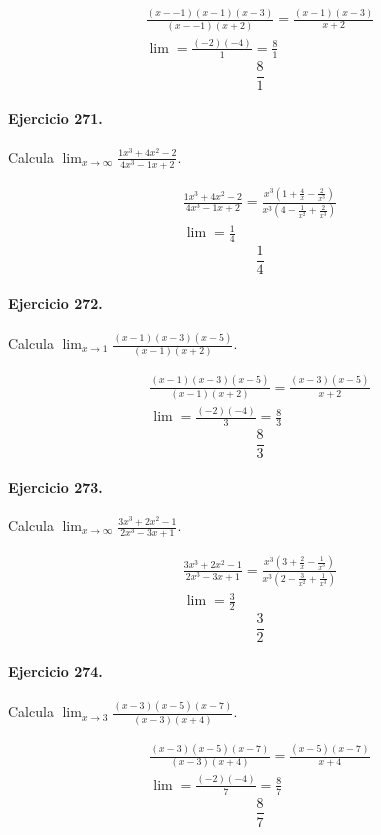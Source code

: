 \documentclass[11pt,a4paper]{article}
\begin{document}
\[
\begin{aligned}
\frac{(x--1)(x-1)(x-3)}{(x--1)(x+2)}=\frac{(x-1)(x-3)}{x+2}\\
\lim=\frac{(-2)(-4)}{1}=\frac{8}{1}
\end{aligned}
\]
\[\boxed{\frac{8}{1}}\]


\paragraph{Ejercicio 271.} Calcula $\displaystyle\lim_{x\to\infty}\frac{1x^3+4x^2-2}{4x^3-1x+2}$. 

\[
\begin{aligned}
\frac{1x^3+4x^2-2}{4x^3-1x+2}=\frac{x^3(1+\frac{4}{x}-\frac{2}{x^3})}{x^3(4-\frac{1}{x^2}+\frac{2}{x^3})}\\
\lim=\frac{1}{4}
\end{aligned}
\]
\[\boxed{\frac{1}{4}}\]


\paragraph{Ejercicio 272.} Calcula $\displaystyle\lim_{x\to 1}\frac{(x-1)(x-3)(x-5)}{(x-1)(x+2)}$. 

\[
\begin{aligned}
\frac{(x-1)(x-3)(x-5)}{(x-1)(x+2)}=\frac{(x-3)(x-5)}{x+2}\\
\lim=\frac{(-2)(-4)}{3}=\frac{8}{3}
\end{aligned}
\]
\[\boxed{\frac{8}{3}}\]


\paragraph{Ejercicio 273.} Calcula $\displaystyle\lim_{x\to\infty}\frac{3x^3+2x^2-1}{2x^3-3x+1}$. 

\[
\begin{aligned}
\frac{3x^3+2x^2-1}{2x^3-3x+1}=\frac{x^3(3+\frac{2}{x}-\frac{1}{x^3})}{x^3(2-\frac{3}{x^2}+\frac{1}{x^3})}\\
\lim=\frac{3}{2}
\end{aligned}
\]
\[\boxed{\frac{3}{2}}\]


\paragraph{Ejercicio 274.} Calcula $\displaystyle\lim_{x\to 3}\frac{(x-3)(x-5)(x-7)}{(x-3)(x+4)}$. 

\[
\begin{aligned}
\frac{(x-3)(x-5)(x-7)}{(x-3)(x+4)}=\frac{(x-5)(x-7)}{x+4}\\
\lim=\frac{(-2)(-4)}{7}=\frac{8}{7}
\end{aligned}
\]
\[\boxed{\frac{8}{7}}\]
\end{document}
